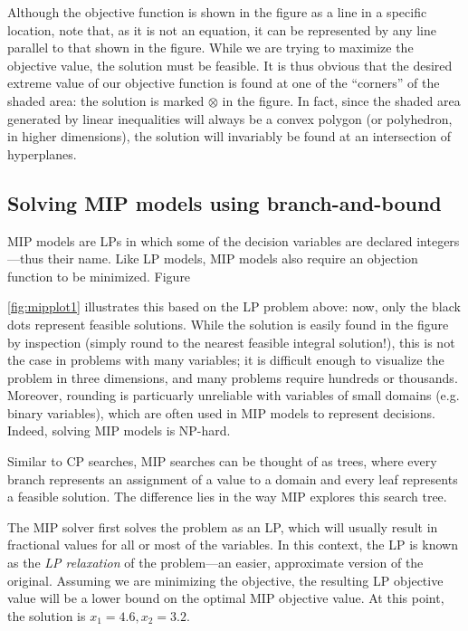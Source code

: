 \documentclass[13pt, letterpaper, oneside]{book}
\begin{document}
Although the objective function is shown in the figure as a line in a specific
location, note that, as it is not an equation, it can be represented by any line
parallel to that shown in the figure. While we are trying to maximize the
objective value, the solution must be feasible. It is thus obvious
that the desired extreme value of our objective function is found at one of the
``corners'' of the shaded area: the solution is marked $\otimes$ in the figure.
In fact, since the shaded area generated by linear inequalities will always be a
convex polygon (or polyhedron, in higher dimensions), the solution will
invariably be found at an intersection of hyperplanes.

\subsection{Solving MIP models using branch-and-bound}
MIP models are LPs in which some of the decision variables are declared
integers---thus their name.  Like LP models, MIP models also require an
objection function to be minimized. Figure

\ref{fig:mipplot1} illustrates this based on the LP problem above: now, only the
black dots represent feasible solutions. While the solution is easily found in
the figure by inspection (simply round to the nearest feasible integral
solution!), this is not the case in problems with many variables; it is
difficult enough to visualize the problem in three dimensions, and many problems
require hundreds or thousands. Moreover, rounding is particuarly unreliable 
with variables of small domains (e.g. binary variables), which are often used in
MIP models to represent decisions. Indeed, solving MIP models is NP-hard.

Similar to CP searches, MIP searches can be thought of as trees, where every
branch represents an assignment of a value to a domain and every leaf represents
a feasible solution. The difference lies in the way MIP explores this search tree.

The MIP solver first solves the problem as an LP, which will usually result in
fractional values for all or most of the variables. In this context, the LP is
known as the \textit{LP relaxation} of the problem---an easier, approximate
version of the original. Assuming we are minimizing the objective, the resulting
LP objective value will be a lower bound on the optimal MIP objective value.
At this point, the solution is $x_1 = 4.6, x_2 = 3.2$.
\end{document}
